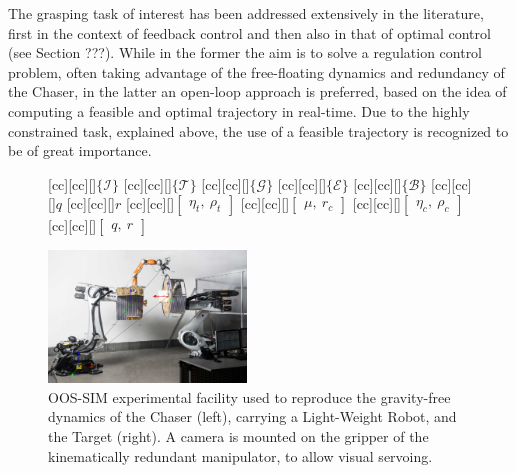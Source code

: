 The grasping task of interest has been addressed extensively in the literature, first in the context of feedback control and then also in that of optimal control (see Section ???). While in the former the aim is to solve a regulation control problem, often taking advantage of the free-floating dynamics and redundancy of the Chaser, in the latter an open-loop approach is preferred, based on the idea of computing a feasible and optimal trajectory in real-time. Due to the highly constrained task, explained above, the use of a feasible trajectory is recognized to be of great importance.
\begin{figure}[t!]
[cc][cc][\FontFigBBB]{{\color{white}$\{\mathcal{I}\}$}}
[cc][cc][\FontFigBBB]{{\color{black}$\{\mathcal{T}\}$}}
[cc][cc][\FontFigBBB]{{\color{black}$\{\mathcal{G}\}$}}
[cc][cc][\FontFigBBB]{{\color{black}$\{\mathcal{E}\}$}}
[cc][cc][\FontFigBBB]{{\color{white}$\{\mathcal{B}\}$}}
[cc][cc][\FontFigBB]{{\color{black}$q$}}
[cc][cc][\FontFigBB]{{\color{black}$r$}}
[cc][cc][\FontFigBB]{{\color{black}$\begin{bmatrix}\eta_t,~ \rho_t \end{bmatrix}$}}
[cc][cc][\FontFigBB]{{\color{black}$\begin{bmatrix}\mu,~ r_c \end{bmatrix}$}}
[cc][cc][\FontFigBB]{{\color{black}$\begin{bmatrix}\eta_c,~ \rho_c \end{bmatrix}$}}
[cc][cc][\FontFigBB]{{\color{black}$\begin{bmatrix}q,~ r \end{bmatrix}$}}

\centering\includegraphics[angle=0,width=0.47\textwidth]{motiv.eps}
\caption{OOS-SIM experimental facility used to reproduce the gravity-free dynamics of the Chaser (left), carrying a Light-Weight Robot, and the Target (right). A camera is mounted on the gripper of the kinematically redundant manipulator, to allow visual servoing.}
\label{fig:facility}
\end{figure}

